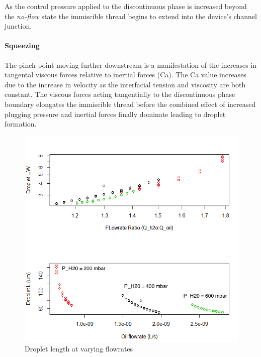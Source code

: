 As the control pressure applied to the discontinuous phase is increased beyond the \emph{no-flow} state the immiscible thread begins to extend into the device's channel junction. 


\paragraph{Squeezing}

The pinch point moving further downstream is a manifestation of the increases in tangental viscous forces relative to inertial forces (Ca). The Ca value increases due to the increase in velocity as the interfacial tension and viscosity are both constant. The viscous forces acting tangentially to the discontinuous phase boundary elongates the immiscible thread before the combined effect of increased plugging pressure and inertial forces finally dominate leading to droplet formation.

\begin{figure}[h]
\centering 
\includegraphics[width=0.750\columnwidth]{constP.PNG} 
\caption[Regime Change at varying flows]{Droplet length at varying flowrates} 
\label{fig:constP} 
\end{figure}


